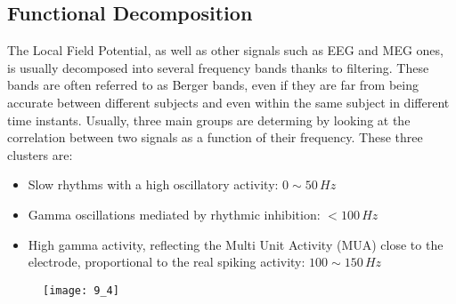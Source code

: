 \subsection{Functional Decomposition}
The Local Field Potential, as well as other signals such as EEG and MEG ones,
is usually decomposed into several frequency bands thanks to filtering.
These bands are often referred to as Berger bands, even if they are far from
being accurate between different subjects and even within the same subject in
different time instants. Usually, three main groups are determing by looking
at the correlation between two signals as a function of their frequency.
These three clusters are:
\begin{itemize}
    \item Slow rhythms with a high oscillatory activity: \(0\sim{50}\,Hz\)
    \item Gamma oscillations mediated by rhythmic inhibition: \(<100\,Hz\)
    \item High gamma activity, reflecting the Multi Unit Activity (MUA) close
    to the electrode, proportional to the real spiking activity: \(100\sim{150}\,Hz\)
\end{itemize}
\begin{figure}[H]
    \texttt{[image: 9\_4]}
    \centering
\end{figure}